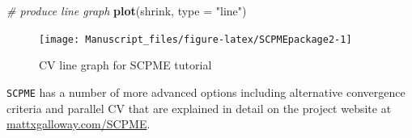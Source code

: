\documentclass[11pt,]{report}
\newenvironment{Shaded}{\begin{snugshade}}{\end{snugshade}}
\newcommand{\CommentTok}[1]{\textcolor[rgb]{0.56,0.35,0.01}{\textit{#1}}}
\newcommand{\DataTypeTok}[1]{\textcolor[rgb]{0.13,0.29,0.53}{#1}}
\newcommand{\KeywordTok}[1]{\textcolor[rgb]{0.13,0.29,0.53}{\textbf{#1}}}
\newcommand{\NormalTok}[1]{#1}
\newcommand{\StringTok}[1]{\textcolor[rgb]{0.31,0.60,0.02}{#1}}
\begin{document}
\begin{Shaded}
\begin{Highlighting}[]
\CommentTok{# produce line graph}
\KeywordTok{plot}\NormalTok{(shrink, }\DataTypeTok{type =} \StringTok{"line"}\NormalTok{)}
\end{Highlighting}
\end{Shaded}

\begin{figure}

{\centering \texttt{[image: Manuscript\_files/figure-latex/SCPMEpackage2-1]} 

}

\caption{CV line graph for SCPME tutorial}\label{fig:SCPMEpackage2}
\end{figure}

\vspace{0.5cm}

\texttt{SCPME} has a number of more advanced options including alternative convergence criteria and parallel CV that are explained in detail on the project website at \href{http://mattxgalloway.com/SCPME/}{mattxgalloway.com/SCPME}.


\end{document}
